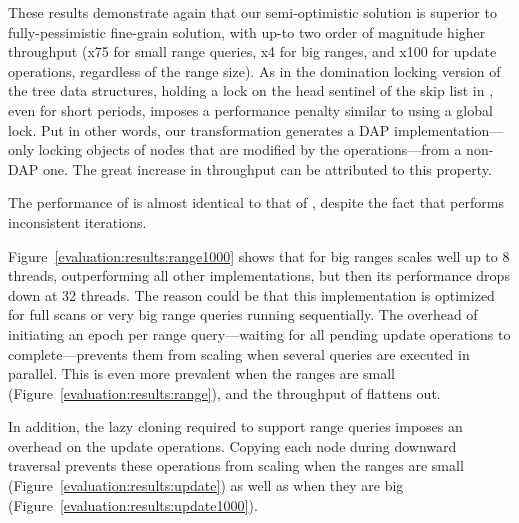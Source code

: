 These results demonstrate again that our semi-optimistic
solution is superior to fully-pessimistic fine-grain solution, with up-to two
order of magnitude higher throughput (x75 for small range queries, x4 for big
ranges, and x100 for update operations, regardless of the range size). As in the
domination locking version of the tree data structures, holding a lock on the head sentinel of the skip list in
\domSkiplist, even for short periods, imposes a performance penalty similar to
using a global lock. Put in other words, our transformation generates a DAP
implementation---only locking objects of nodes that are modified by the
operations---from a non-DAP one. The great increase in throughput can
be attributed to this property.

The performance of \autoSkiplist is almost
identical to that of \skiplist, despite the fact that \skiplist performs inconsistent iterations.

Figure~\ref{evaluation:results:range1000}
shows that for big ranges \bronson scales well up to 8 threads, outperforming
all other implementations, but then its performance drops down at 32 threads.
The reason could be that this implementation is
optimized for full scans or very big range queries running sequentially.
The overhead of initiating an epoch per range query---waiting for all
pending update operations to complete---prevents them from scaling when 
several queries are executed in parallel. This is even more prevalent when the
ranges are small (Figure~\ref{evaluation:results:range}), and the throughput of
\bronson flattens out. 
  
In addition, the lazy cloning required to support
range queries imposes an overhead on the update operations. Copying each node
during downward traversal prevents these operations from scaling when
the ranges are small (Figure~\ref{evaluation:results:update}) as well as when
they are big (Figure~\ref{evaluation:results:update1000}).
